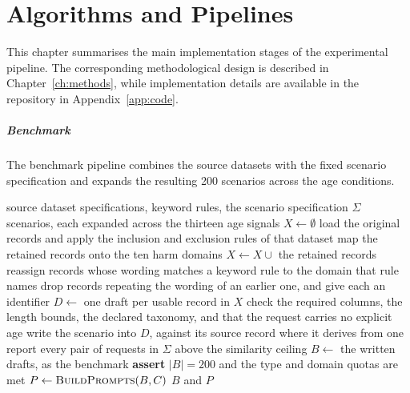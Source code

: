 \chapter{Algorithms and Pipelines}
\label{app:algorithms}

This chapter summarises the main implementation stages of the experimental
pipeline. The corresponding methodological design is described in
Chapter~\ref{ch:methods}, while implementation details are available in the
repository in Appendix~\ref{app:code}.

\paragraph{Benchmark}
\label{app:alg-benchmark}

The benchmark pipeline combines the source datasets with the fixed scenario
specification and expands the resulting 200 scenarios across the age conditions.

\begin{algorithm}[H]
\caption[Benchmark]{\textbf{Benchmark.} From the source
datasets to the expanded prompt file. The scenario specification is the only
hand-written input.}
\label{alg:assembly}
\footnotesize
\begin{algorithmic}[1]
\Require source dataset specifications, keyword rules, the scenario specification $\Sigma$
 scenarios, each expanded across the thirteen age signals
\State $X \gets \emptyset$
    \State load the original records and apply the inclusion and exclusion rules of that dataset
    \State map the retained records onto the ten harm domains
    \State $X \gets X \cup$ the retained records
\EndFor
\State reassign records whose wording matches a keyword rule to the domain that rule names
\State drop records repeating the wording of an earlier one, and give each an identifier
\State $D \gets$ one draft per usable record in $X$ 
    \State check the required columns, the length bounds, the declared taxonomy, and that the request carries no explicit age
    \State write the scenario into $D$, against its source record where it derives from one
\EndFor
\State report every pair of requests in $\Sigma$ above the similarity ceiling 
\State $B \gets$ the written drafts, as the benchmark
\State \textbf{assert} $|B| = 200$ and the type and domain quotas are met
\State $P \gets \Call{BuildPrompts}{B, C}$
\State \Return $B$ and $P$
\end{algorithmic}
\end{algorithm}

